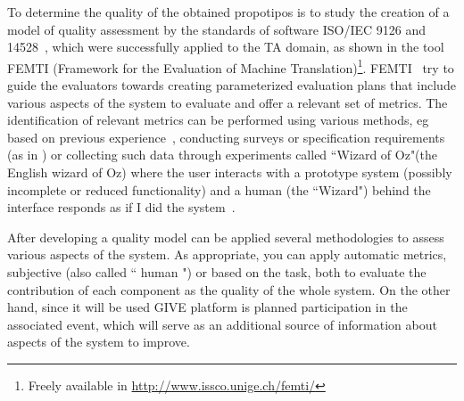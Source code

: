 \noindent
To determine the quality of the obtained propotipos is to study the creation of
a model of quality assessment by the standards of software ISO/IEC 9126 and
14528~\cite{ISO9126-1,ISO14598-1}, which were successfully applied to the
TA domain, as shown in the tool FEMTI (Framework for the Evaluation of Machine
Translation)\footnote{Freely available in
\url{http://www.issco.unige.ch/femti/}}. FEMTI~\cite{Est2005}
try to guide the evaluators towards creating parameterized evaluation
plans that include various aspects of the system to evaluate and offer a
relevant set of metrics. The identification of relevant metrics can be performed
using various methods, eg based on previous
experience~\cite{paradise06,Chu2000,Litman2002}, conducting
surveys or specification requirements (as in \cite{Lecoeuche98}) or
collecting such data through experiments called ``Wizard of Oz"(the
English wizard of Oz) where the user interacts with a prototype system (possibly
incomplete or reduced functionality) and a human (the ``Wizard") behind the
interface responds as if I did the system~\cite{Dahlback93,Fabbrizio05}.


After developing a quality model can be applied several methodologies to assess
various aspects of the system. As appropriate, you can apply automatic metrics,
subjective (also called `` human ") or based on the task, both to evaluate the
contribution of each component as the quality of the whole system. On the other
hand, since it will be used GIVE platform is planned participation in the
associated event, which will serve as an additional source of information about
aspects of the system to improve.



